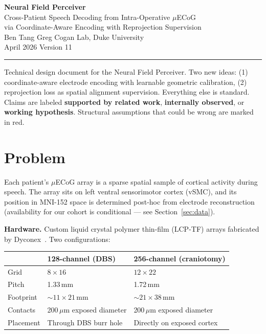 \documentclass[11pt,letterpaper]{article}
\begin{document}
\begin{center}
{\LARGE\bfseries Neural Field Perceiver}\\[6pt]
{\large Cross-Patient Speech Decoding from Intra-Operative $\mu$ECoG\\via Coordinate-Aware Encoding with Reprojection Supervision}\\[12pt]
{\normalsize Ben Tang \quad\textbar\quad Greg Cogan Lab, Duke University}\\[4pt]
{\normalsize April 2026 \quad\textbar\quad Version 11}
\end{center}

\medskip\noindent\rule{\textwidth}{0.4pt}\medskip

\noindent Technical design document for the Neural Field Perceiver.
Two new ideas: (1) coordinate-aware electrode encoding with learnable geometric calibration, (2) reprojection loss as spatial alignment supervision. Everything else is standard.
Claims are labeled \textbf{supported by related work}, \textbf{internally observed}, or \textbf{working hypothesis}.
Structural assumptions that could be wrong are marked in \textcolor{BrickRed}{red}.

\tableofcontents
\newpage



\section{Problem}\label{sec:problem}

Each patient's $\mu$ECoG array is a sparse spatial sample of cortical activity during speech. The array sits on left ventral sensorimotor cortex (vSMC), and its position in MNI-152 space is determined post-hoc from electrode reconstruction (availability for our cohort is conditional --- see Section~\ref{sec:data}).

\textbf{Hardware.} Custom liquid crystal polymer thin-film (LCP-TF) arrays fabricated by Dyconex~\cite{duraivel2023}. Two configurations:

\begin{table}[ht!]\centering\small
\begin{tabular}{@{}lll@{}}
\toprule
& \textbf{128-channel (DBS)} & \textbf{256-channel (craniotomy)} \\
\midrule
Grid & $8 \times 16$ & $12 \times 22$ \\
Pitch & 1.33\,mm & 1.72\,mm \\
Footprint & ${\sim}11 \times 21$\,mm & ${\sim}21 \times 38$\,mm \\
Contacts & 200\,$\mu$m exposed diameter & 200\,$\mu$m exposed diameter \\
Placement & Through DBS burr hole & Directly on exposed cortex \\
\bottomrule
\end{tabular}
\end{table}
\end{document}
